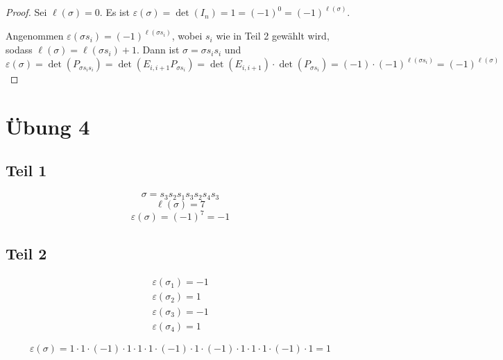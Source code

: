 \documentclass[10pt,a4paper]{article}
\begin{document}
\begin{proof}
Sei $\ell(\sigma) = 0$.
Es ist $\varepsilon(\sigma) = \det(I_{n}) = 1 = (-1)^{0} = (-1)^{\ell(\sigma)}$.

Angenommen $\varepsilon(\sigma s_{i}) = (-1)^{\ell(\sigma s_{i})}$, wobei $s_{i}$ wie in Teil 2 gewählt wird, sodass $\ell(\sigma) = \ell(\sigma s_{i}) + 1$.
Dann ist $\sigma = \sigma s_{i} s_{i}$ und
\begin{equation}
\varepsilon(\sigma) = \det(P_{\sigma s_{i} s_{i}}) = \det(E_{i,i + 1}P_{\sigma s_{i}}) = \det(E_{i,i + 1}) \cdot \det(P_{\sigma s_{i}}) = (-1) \cdot (-1)^{\ell(\sigma s_{i})} = (-1)^{\ell(\sigma)}
\end{equation}
\end{proof}

\section*{Übung 4}

\subsection*{Teil 1}

\begin{equation}
\sigma = s_{3}s_{2}s_{1}s_{3}s_{2}s_{4}s_{3}
\end{equation}
\begin{equation}
\ell(\sigma) = 7
\end{equation}
\begin{equation}
\varepsilon(\sigma) = (-1)^{7} = -1
\end{equation}

\subsection*{Teil 2}

\begin{align*}
\varepsilon(\sigma_{1}) = -1\\
\varepsilon(\sigma_{2}) = 1\\
\varepsilon(\sigma_{3}) = -1\\
\varepsilon(\sigma_{4}) = 1
\end{align*}

\begin{equation}
\varepsilon(\sigma) = 1 \cdot 1 \cdot (-1) \cdot 1 \cdot 1 \cdot 1 \cdot (-1) \cdot 1 \cdot (-1) \cdot 1 \cdot 1 \cdot 1 \cdot (-1) \cdot 1 = 1
\end{equation}
\end{document}
